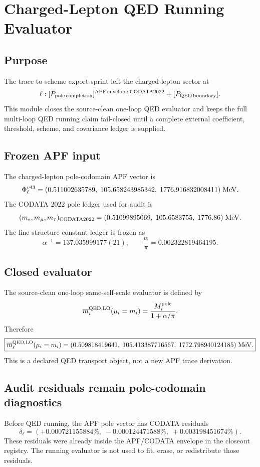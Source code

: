 

\section{Charged-Lepton QED Running Evaluator}
\label{sec:v70-charged-lepton-qed-running}

\subsection{Purpose}
The trace-to-scheme export sprint left the charged-lepton sector at
\[
\ell:
[P_{\rm pole\,completion}]^{\rm APF\,envelope,CODATA2022}
+
[P_{\rm QED\,boundary}].
\]
This module closes the source-clean one-loop QED evaluator and keeps the full multi-loop QED running claim fail-closed until a complete external coefficient, threshold, scheme, and covariance ledger is supplied.

\subsection{Frozen APF input}
The charged-lepton pole-codomain APF vector is
\[
\Phi_\ell^{v43}=
(0.511002635789,\;105.658243985342,\;1776.916832008411)\;{\rm MeV}.
\]
The CODATA 2022 pole ledger used for audit is
\[
(m_e,m_\mu,m_\tau)_{\rm CODATA2022}
=
(0.51099895069,\;105.6583755,\;1776.86)\;{\rm MeV}.
\]
The fine structure constant ledger is frozen as
\[
\alpha^{-1}=137.035999177(21),
\qquad
\frac{\alpha}{\pi}=0.002322819464195.
\]

\subsection{Closed evaluator}
The source-clean one-loop same-self-scale evaluator is defined by
\[
\overline m_i^{\rm QED,LO}(\mu_i=m_i)
=
\frac{M_i^{\rm pole}}{1+\alpha/\pi}.
\]
Therefore
\[
\boxed{
\overline m_\ell^{\rm QED,LO}(\mu_i=m_i)
=
(0.509818419641,\;105.413387716567,\;1772.798940124185)\;{\rm MeV}.
}
\]
This is a declared QED transport object, not a new APF trace derivation.

\subsection{Audit residuals remain pole-codomain diagnostics}
Before QED running, the APF pole vector has CODATA residuals
\[
\delta_\ell=
(+0.000721155884\%,\;-0.000124471588\%,\;+0.003198451674\%).
\]
These residuals were already inside the APF/CODATA envelope in the closeout registry. The running evaluator is not used to fit, erase, or redistribute those residuals.

